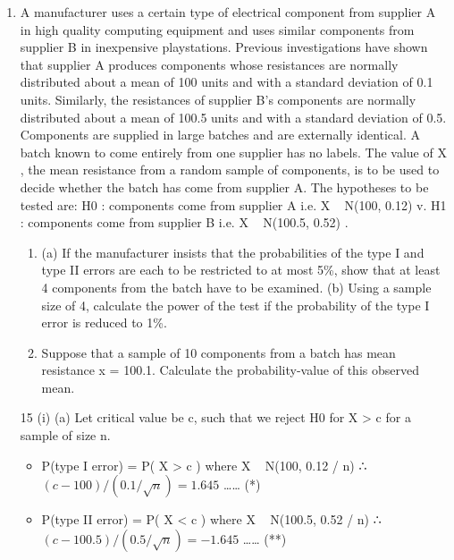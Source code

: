 \documentclass[a4paper,12pt]{article}
\begin{document}
\begin{enumerate}


\item  A manufacturer uses a certain type of electrical component from supplier A in high quality computing equipment and uses similar components from supplier B in inexpensive playstations. Previous investigations have shown that supplier A
produces components whose resistances are normally distributed about a mean of 100 units and with a standard deviation of 0.1 units. Similarly, the resistances of supplier B’s components are normally distributed about a mean of 100.5 units
and with a standard deviation of 0.5. Components are supplied in large batches and are externally identical.
A batch known to come entirely from one supplier has no labels. The value of X , the mean resistance from a random sample of components, is to be used to decide whether the batch has come from supplier A.
The hypotheses to be tested are:
H0 : components come from supplier A i.e. X ~ N(100, 0.12)
v. H1 : components come from supplier B i.e. X ~ N(100.5, 0.52) .

\begin{enumerate}
    \item  (a) If the manufacturer insists that the probabilities of the type I and
type II errors are each to be restricted to at most 5\%, show that at
least 4 components from the batch have to be examined.
(b) Using a sample size of 4, calculate the power of the test if the
probability of the type I error is reduced to 1\%. 
\item  Suppose that a sample of 10 components from a batch has mean
resistance x = 100.1.
Calculate the probability-value of this observed mean. 
\end{enumerate}

\newpage

15 (i) (a) Let critical value be c, such that we reject H0 for X > c for a
sample of size n.
\begin{itemize}
    \item P(type I error) = P( X > c ) where X ~ N(100, 0.12 / n)
∴ $(c − 100) / (0.1 / \sqrt{n}) = 1.645$ …… (*)
    \item P(type II error) = P( X < c ) where X ~ N(100.5, 0.52 / n)
∴ $(c − 100.5) / (0.5 / \sqrt{n}) = −1.645$ …… (**)
\end{itemize}


\end{enumerate}
\end{document}
